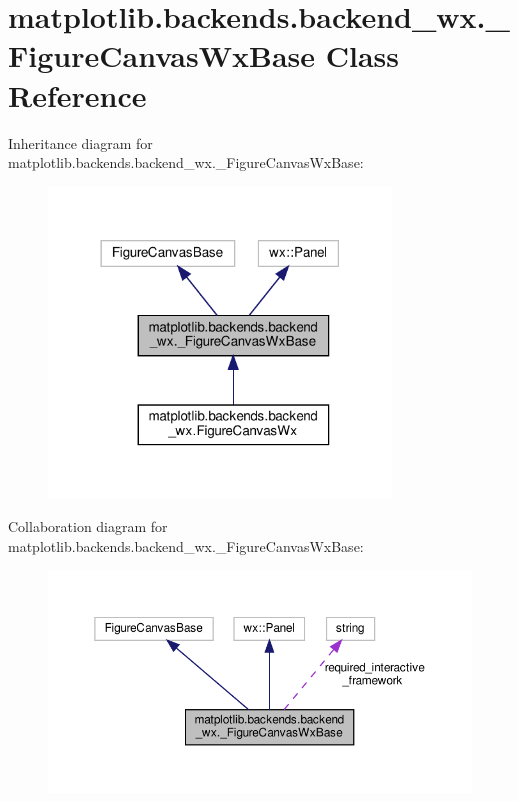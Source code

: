 \hypertarget{classmatplotlib_1_1backends_1_1backend__wx_1_1__FigureCanvasWxBase}{}\section{matplotlib.\+backends.\+backend\+\_\+wx.\+\_\+\+Figure\+Canvas\+Wx\+Base Class Reference}
\label{classmatplotlib_1_1backends_1_1backend__wx_1_1__FigureCanvasWxBase}


Inheritance diagram for matplotlib.\+backends.\+backend\+\_\+wx.\+\_\+\+Figure\+Canvas\+Wx\+Base\+:
\nopagebreak
\begin{figure}[H]
\begin{center}
\leavevmode
\includegraphics[width=258pt]{classmatplotlib_1_1backends_1_1backend__wx_1_1__FigureCanvasWxBase__inherit__graph}
\end{center}
\end{figure}


Collaboration diagram for matplotlib.\+backends.\+backend\+\_\+wx.\+\_\+\+Figure\+Canvas\+Wx\+Base\+:
\nopagebreak
\begin{figure}[H]
\begin{center}
\leavevmode
\includegraphics[width=350pt]{classmatplotlib_1_1backends_1_1backend__wx_1_1__FigureCanvasWxBase__coll__graph}
\end{center}
\end{figure}
